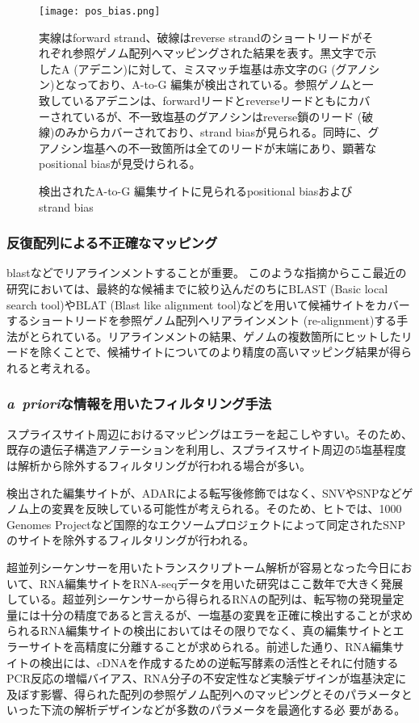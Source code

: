 \begin{figure}[!h]
	\begin{center}
		\texttt{[image: pos\_bias.png]}
	\end{center}
	\caption{検出されたA-to-G 編集サイトに見られるpositional biasおよびstrand bias}
	\begin{flushleft}
		\small{実線はforward strand、破線はreverse strandのショートリードがそれぞれ参照ゲノム配列へマッピングされた結果を表す。黒文字で示したA (アデニン)に対して、ミスマッチ塩基は赤文字のG (グアノシン)となっており、A-to-G 編集が検出されている。参照ゲノムと一致しているアデニンは、forwardリードとreverseリードともにカバーされているが、不一致塩基のグアノシンはreverse鎖のリード (破線)のみからカバーされており、strand biasが見られる。同時に、グアノシン塩基への不一致箇所は全てのリードが末端にあり、顕著なpositional biasが見受けられる。}
	\end{flushleft}
	\label{fig:positional_bias}
\end{figure}

\subsubsection{反復配列による不正確なマッピング}
blastなどでリアラインメントすることが重要。
このような指摘からここ最近の研究においては、最終的な候補までに絞り込んだのちにBLAST (Basic local search tool)やBLAT (Blast like alignment tool)などを用いて候補サイトをカバーするショートリードを参照ゲノム配列へリアラインメント (re-alignment)する手法がとられている。リアラインメントの結果、ゲノムの複数箇所にヒットしたリードを除くことで、候補サイトについてのより精度の高いマッピング結果が得られると考えれる。

\subsubsection{\textit{a\ priori}な情報を用いたフィルタリング手法}
スプライスサイト周辺におけるマッピングはエラーを起こしやすい。そのため、既存の遺伝子構造アノテーションを利用し、スプライスサイト周辺の5塩基程度は解析から除外するフィルタリングが行われる場合が多い。
\par
検出された編集サイトが、ADARによる転写後修飾ではなく、SNVやSNPなどゲノム上の変異を反映している可能性が考えられる。そのため、ヒトでは、1000 Genomes Projectなど国際的なエクソームプロジェクトによって同定されたSNPのサイトを除外するフィルタリングが行われる。
\par
超並列シーケンサーを用いたトランスクリプトーム解析が容易となった今日において、RNA編集サイトをRNA-seqデータを用いた研究はここ数年で大きく発展している。超並列シーケンサーから得られるRNAの配列は、転写物の発現量定量には十分の精度であると言えるが、一塩基の変異を正確に検出することが求められるRNA編集サイトの検出においてはその限りでなく、真の編集サイトとエラーサイトを高精度に分離することが求められる。前述した通り、RNA編集サイトの検出には、cDNAを作成するための逆転写酵素の活性とそれに付随するPCR反応の増幅バイアス、RNA分子の不安定性など実験デザインが塩基決定に及ぼす影響、得られた配列の参照ゲノム配列へのマッピングとそのパラメータといった下流の解析デザインなどが多数のパラメータを最適化する必
要がある。

